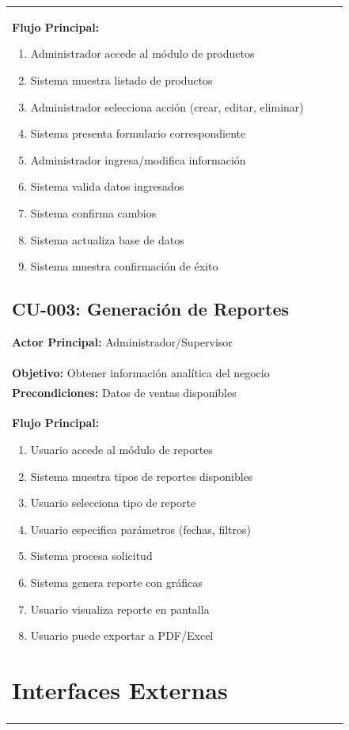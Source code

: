 \documentclass[12pt,letterpaper]{article}
\begin{document}
\begin{longtable}{|p{3cm}|p{2cm}|p{4cm}|p{6cm}|}
\textbf{Flujo Principal:}
\begin{enumerate}
    \item Administrador accede al módulo de productos
    \item Sistema muestra listado de productos
    \item Administrador selecciona acción (crear, editar, eliminar)
    \item Sistema presenta formulario correspondiente
    \item Administrador ingresa/modifica información
    \item Sistema valida datos ingresados
    \item Sistema confirma cambios
    \item Sistema actualiza base de datos
    \item Sistema muestra confirmación de éxito
\end{enumerate}

\subsection{CU-003: Generación de Reportes}
\textbf{Actor Principal:} Administrador/Supervisor \\
\textbf{Objetivo:} Obtener información analítica del negocio \\
\textbf{Precondiciones:} Datos de ventas disponibles \\

\textbf{Flujo Principal:}
\begin{enumerate}
    \item Usuario accede al módulo de reportes
    \item Sistema muestra tipos de reportes disponibles
    \item Usuario selecciona tipo de reporte
    \item Usuario especifica parámetros (fechas, filtros)
    \item Sistema procesa solicitud
    \item Sistema genera reporte con gráficas
    \item Usuario visualiza reporte en pantalla
    \item Usuario puede exportar a PDF/Excel
\end{enumerate}

\section{Interfaces Externas}


\end{longtable}
\end{document}
